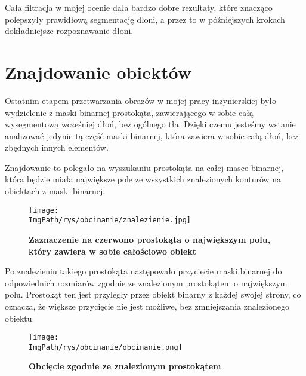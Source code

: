 \documentclass[a4paper,12pt,twoside,openany]{report}
\newcommand{\ImgPath}{.}
\begin{document}
Cała filtracja  w mojej ocenie dała bardzo dobre rezultaty, które znacząco polepszyły prawidłową segmentację dłoni, a przez to w późniejszych krokach dokładniejsze rozpoznawanie dłoni.

\section{Znajdowanie obiektów}
Ostatnim etapem przetwarzania obrazów w mojej pracy inżynierskiej było wydzielenie z maski binarnej prostokąta, zawierającego w sobie całą wysegmentową wcześniej dłoń, bez ogólnego tła. Dzięki czemu jesteśmy wstanie analizować jedynie tą część maski binarnej, która zawiera w sobie całą dłoń, bez zbędnych innych elementów.

Znajdowanie to polegało na wyszukaniu prostokąta na całej masce binarnej, która będzie miała największe pole ze wszystkich znalezionych konturów na obiektach z maski binarnej. 

\begin{figure}[H]
	\centering
	{\label{fig:a}\texttt{[image: \\ImgPath/rys/obcinanie/znalezienie.jpg]}}
	\caption{  \textbf{Zaznaczenie na czerwono prostokąta o największym polu, który zawiera w sobie całościowo obiekt}}
\end{figure}

Po znalezieniu takiego prostokąta następowało przycięcie maski binarnej do odpowiednich rozmiarów zgodnie ze znalezionym prostokątem o największym polu. Prostokąt ten jest przyległy przez obiekt binarny z każdej swojej strony, co oznacza, że większe przycięcie nie jest możliwe, bez zmniejszania znalezionego obiektu.

\begin{figure}[H]
	\centering
	{\label{fig:b}\texttt{[image: \\ImgPath/rys/obcinanie/obcinanie.png]}}
	\caption{  \textbf{Obcięcie zgodnie ze znalezionym prostokątem}}
\end{figure}
\end{document}
